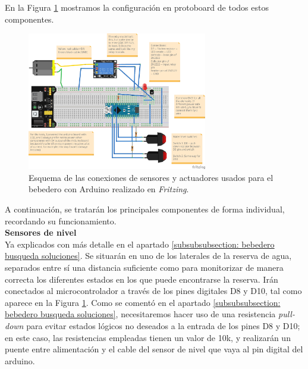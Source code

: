 \documentclass[12pt]{article}
\begin{document}
	\noindent En la Figura \ref{Esquema conexiones bebedero Fritzing} mostramos la configuración en protoboard de todos estos componentes.
	
	
	\begin{figure}[h]
		\begin{center}
			\includegraphics[width=0.7\textwidth]{img/bebedero_test_fritzing.jpg}
			\caption{Esquema de las conexiones de sensores y actuadores usados para el bebedero con Arduino realizado en \textit{Fritzing}.}
			\label{Esquema conexiones bebedero Fritzing}
		\end{center}
	\end{figure}

	\noindent A continuación, se tratarán los principales componentes de forma individual, recordando su funcionamiento. \\
	
	\noindent \textbf{Sensores de nivel}\\
	
	\noindent Ya explicados con más detalle en el apartado \ref{subsubsubsection: bebedero busqueda soluciones}. Se situarán en uno de los laterales de la reserva de agua, separados entre sí una distancia suficiente como para monitorizar de manera correcta los diferentes estados en los que puede encontrarse la reserva. Irán conectados al microcontrolador a través de los pines digitales D8 y D10, tal como aparece en la Figura \ref{Esquema conexiones bebedero Fritzing}. Como se comentó en el apartado \ref{subsubsubsection: bebedero busqueda soluciones}, necesitaremos hacer uso de una resistencia \textit{pull-down} para evitar estados lógicos no deseados a la entrada de los pines D8 y D10; en este caso, las resistencias empleadas tienen un valor de 10k, y realizarán un puente entre alimentación y el cable del sensor de nivel que vaya al pin digital del arduino.
	
\end{document}

